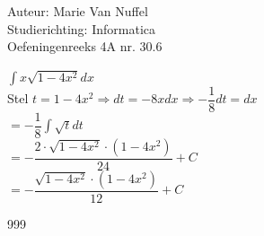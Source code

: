 \documentclass[a4paper]{article}
\begin{document}
  
\noindent \large Auteur: Marie Van Nuffel \\
\noindent \large Studierichting: Informatica\\
\noindent \large Oefeningenreeks 4A nr. 30.6\\

\medskip

\normalsize

$ \displaystyle\int x \sqrt{1 - 4x^2} dx $ \\

Stel $t = 1 -4x^2 \Rightarrow dt = -8x dx  \Rightarrow -\dfrac{1}{8}dt = dx$\\

$ = - \dfrac{1}{8} \displaystyle\int \sqrt{t} dt $\\

$ = - \dfrac{2 \cdot \sqrt{1-4x^2} \cdot (1-4x^2)}{24} + C $\\

$ = - \dfrac{\sqrt{1-4x^2} \cdot (1-4x^2)}{12} + C $\\

\begin{thebibliography}{999}
\end{thebibliography}
\end{document}
